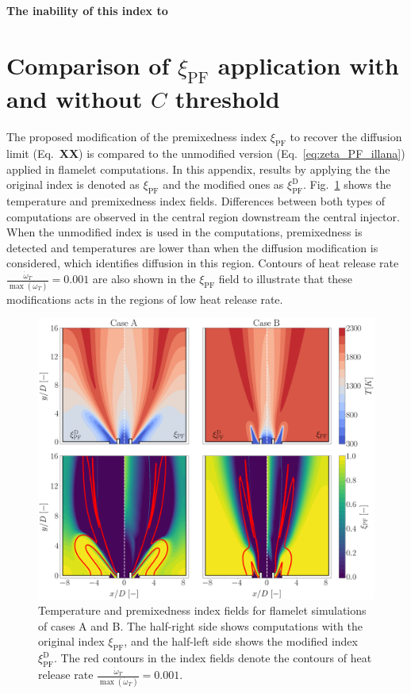 \documentclass[preprint,12pt,authoryear]{elsarticle}
\begin{document}
{\textbf{The inability of this index to }


\appendix
\section{Comparison of $\xi_\mathrm{PF}$ application with and without $C$ threshold}
\label{sec:app_index_with_without_threshold}

The proposed modification of the premixedness index $\xi_\mathrm{PF}$ to recover the diffusion limit (Eq.~\textbf{XX}) is compared to the unmodified version (Eq.~\ref{eq:zeta_PF_illana}) applied in flamelet computations. In this appendix, results by applying the the original index is denoted as $\xi_\mathrm{PF}$ and the modified ones as $\xi_\mathrm{PF}^\mathrm{D}$. Fig.~\ref{fig:app:fts_maps_T_xi} shows the temperature and premixedness index fields. Differences between both types of computations are observed in the central region downstream the central injector. When the unmodified index is used in the computations, premixedness is detected and temperatures are lower than when the diffusion modification is considered, which identifies diffusion in this region. Contours of heat release rate $ \frac{\dot{\omega}_T }{\max \left( \dot{\omega}_T \right) } = 0.001$ are also shown in the $\xi_\mathrm{PF}$ field to illustrate that these modifications acts in the regions of low heat release rate. 

\begin{figure}[h!]
    \centering
	\includegraphics[scale=0.2]{./figures_appendix/fts_maps_T_xi}
	\caption{Temperature and premixedness index fields for flamelet simulations of cases A and B. The half-right side shows computations with the original index $\xi_\mathrm{PF}$, and the half-left side shows the modified index $\xi_\mathrm{PF}^\mathrm{D}$. The red contours in the index fields denote the contours of heat release rate $ \frac{\dot{\omega}_T }{\max \left( \dot{\omega}_T \right) } = 0.001$.}
	\label{fig:app:fts_maps_T_xi}
\end{figure}


}
\end{document}
